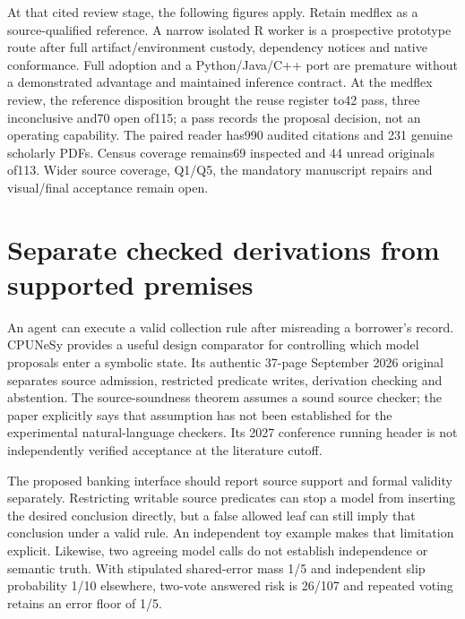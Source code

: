At that cited review stage, the following figures apply. Retain medflex
as a source-qualified reference. A narrow isolated R worker is a
prospective prototype route after full artifact/environment custody,
dependency notices and native conformance. Full adoption and a
Python/Java/C++ port are premature without a demonstrated advantage and
maintained inference contract. At the medflex review, the reference
disposition brought the reuse register to42 pass, three inconclusive
and70 open of115; a pass records the proposal decision, not an operating
capability. The paired reader has990 audited citations and 231 genuine
scholarly PDFs. Census coverage remains69 inspected and 44 unread
originals of113. Wider source coverage, Q1/Q5, the mandatory manuscript
repairs and visual/final acceptance remain open.
\citep{sp23medflex_reader,sp23medflex_progress}

\hypertarget{separate-checked-derivations-from-supported-premises}{%
\section{Separate checked derivations from supported
premises}\label{separate-checked-derivations-from-supported-premises}}

An agent can execute a valid collection rule after misreading a
borrower's record. CPUNeSy provides a useful design comparator for
controlling which model proposals enter a symbolic state. Its authentic
37-page September 2026 original separates source admission, restricted
predicate writes, derivation checking and abstention. The
source-soundness theorem assumes a sound source checker; the paper
explicitly says that assumption has not been established for the
experimental natural-language checkers. Its 2027 conference running
header is not independently verified acceptance at the literature
cutoff. \citep{exec23_controlled_writes_paper}

The proposed banking interface should report source support and formal
validity separately. Restricting writable source predicates can stop a
model from inserting the desired conclusion directly, but a false
allowed leaf can still imply that conclusion under a valid rule. An
independent toy example makes that limitation explicit. Likewise, two
agreeing model calls do not establish independence or semantic truth.
With stipulated shared-error mass 1/5 and independent slip probability
1/10 elsewhere, two-vote answered risk is 26/107 and repeated voting
retains an error floor of 1/5.
\citep{exec23_controlled_writes_paper,exec23_controlled_writes_reference}

